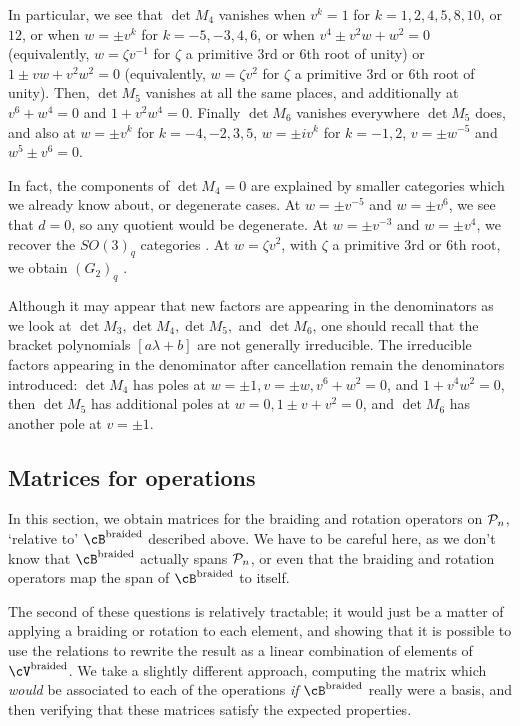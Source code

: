 \documentclass[12pt]{amsart}
\begin{document}
In particular, we see that $\det M_4$ vanishes when $v^k = 1$ for
$k=1,2,4,5,8,10$, or $12$, or when $w = \pm v^k$ for $k=-5,-3,4,6$, or when
$v^4 \pm v^2 w + w^2 = 0$ (equivalently, $w = \zeta v^{-1}$ for $\zeta$ a
primitive 3rd or 6th root of unity) or $1 \pm v w + v^2 w^2 = 0$
(equivalently, $w = \zeta v^2$ for $\zeta$ a primitive 3rd or 6th root of
unity). Then, $\det M_5$ vanishes at all the same places, and additionally at
$v^6 + w^4 = 0$ and $1 + v^2 w^4 = 0$.  Finally $\det M_6$ vanishes everywhere $\det
M_5$ does, and also at $w = \pm v^k$ for $k=-4,-2,3,5$, $w = \pm i v^k$ for
$k=-1,2$, $v = \pm w^{-5}$ and $w^5 \pm v^6 = 0$.

In fact, the components of $\det M_4 = 0$ are explained by smaller categories
which we already know about, or degenerate cases.  At $w = \pm v^{-5}$ and $w =
\pm v^6$, we see that $d=0$, so any quotient would be degenerate. At $w = \pm
v^{-3}$ and $w = \pm v^4$, we recover the $SO(3)_q$ categories .
At $w = \zeta v^2$, with $\zeta$ a primitive 3rd or 6th root, we obtain
$(G_2)_q$ . 

Although it may appear that new factors are appearing in the
denominators as we look at $\det M_3, \det M_4, \det M_5, $ and $\det
M_6$, one should recall that the bracket polynomials $[a \lambda + b]$
are not generally irreducible.  The
irreducible factors appearing in the denominator after cancellation
remain the denominators  introduced: $\det M_4$ has poles
at $w=\pm1, v=\pm w, v^6+w^2 = 0$, and $1+v^4w^2 = 0$,
then $\det M_5$ has additional poles at $w=0, 1\pm v + v^2 = 0$, and $\det M_6$
has another pole at $v = \pm 1$.


\subsection{Matrices for operations}
In this section, we obtain matrices for the braiding and rotation operators on
 $\mathcal{P}_n$, `relative to' $\cB^{\text{braided}}$ described above.
We have to be careful here, as we don't know that $\cB^{\text{braided}}$
actually spans $\mathcal{P}_n$, or even that the braiding and rotation operators map
the span of $\cB^{\text{braided}}$ to itself.

The second of these questions is relatively tractable; it would just be a
matter of applying a braiding or rotation to each element, and showing that it
is possible to use the relations to rewrite the result as a linear combination
of elements of $\cV^{\text{braided}}$. We take a slightly different approach,
computing the matrix which \emph{would} be associated to each of the
operations \emph{if} $\cB^{\text{braided}}$ really were a basis, and then
verifying that these matrices satisfy the expected properties.
\end{document}
